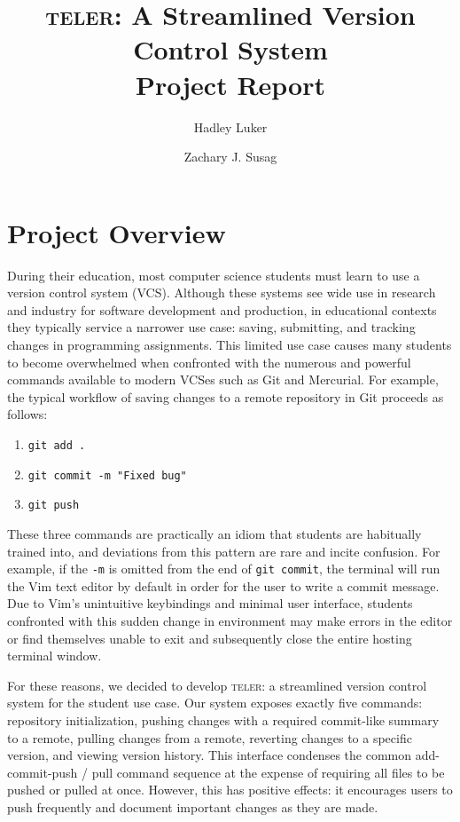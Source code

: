 \documentclass[12pt, letterpaper]{article}
\begin{document}
\title{
  \textsc{teler}: A Streamlined Version Control System\\
  \large Project Report
}

\author{
  Hadley Luker \and Zachary J. Susag
}

\maketitle

\section{Project Overview}
\label{sec:overview}

During their education, most computer science students must learn to use a
version control system (VCS). Although these systems see wide use in research
and industry for software development and production, in educational contexts
they typically service a narrower use case: saving, submitting, and tracking
changes in programming assignments. This limited use case causes many students
to become overwhelmed when confronted with the numerous and powerful commands
available to modern VCSes such as Git and Mercurial. For example, the typical
workflow of saving changes to a remote repository in Git proceeds as follows:

\begin{enumerate}
  \item \texttt{git add .}
  \item \texttt{git commit -m "Fixed bug"}
  \item \texttt{git push}
\end{enumerate}

These three commands are practically an idiom that students are habitually
trained into, and deviations from this pattern are rare and incite confusion.
For example, if the \texttt{-m} is omitted from the end of \texttt{git commit},
the terminal will run the Vim text editor by default in order for the user to
write a commit message. Due to Vim's unintuitive keybindings and minimal user
interface, students confronted with this sudden change in environment may make
errors in the editor or find themselves unable to exit and subsequently close
the entire hosting terminal window.

For these reasons, we decided to develop \textsc{teler}: a streamlined version
control system for the student use case. Our system exposes exactly five
commands: repository initialization, pushing changes with a required commit-like
summary to a remote, pulling changes from a remote, reverting changes to a
specific version, and viewing version history. This interface condenses the
common add-commit-push / pull command sequence at the expense of requiring all
files to be pushed or pulled at once. However, this has positive effects:
it encourages users to push frequently and document important changes as they
are made.
\end{document}
